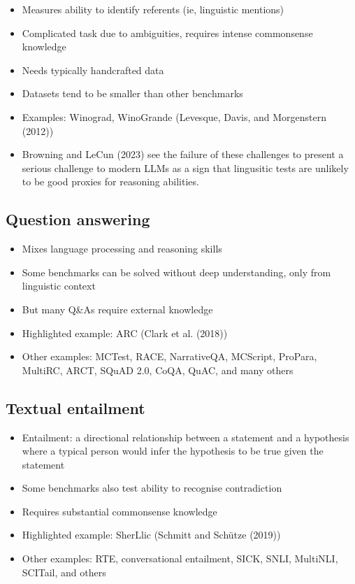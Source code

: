 \documentclass[
]{article}
\providecommand{\tightlist}{%
  \setlength{\itemsep}{0pt}\setlength{\parskip}{0pt}}\usepackage{longtable,booktabs,array}
\begin{document}
\begin{itemize}
\tightlist
\item
  Measures ability to identify referents (ie, linguistic mentions)
\item
  Complicated task due to ambiguities, requires intense commonsense
  knowledge
\item
  Needs typically handcrafted data
\item
  Datasets tend to be smaller than other benchmarks
\item
  Examples: Winograd, WinoGrande (Levesque, Davis, and Morgenstern
  (2012))
\item
  Browning and LeCun (2023) see the failure of these challenges to
  present a serious challenge to modern LLMs as a sign that lingusitic
  tests are unlikely to be good proxies for reasoning abilities.
\end{itemize}

\subsection{Question answering}\label{question-answering}

\begin{itemize}
\tightlist
\item
  Mixes language processing and reasoning skills
\item
  Some benchmarks can be solved without deep understanding, only from
  linguistic context
\item
  But many Q\&As require external knowledge
\item
  Highlighted example: ARC (Clark et al. (2018))
\item
  Other examples: MCTest, RACE, NarrativeQA, MCScript, ProPara, MultiRC,
  ARCT, SQuAD 2.0, CoQA, QuAC, and many others
\end{itemize}

\subsection{Textual entailment}\label{textual-entailment}

\begin{itemize}
\tightlist
\item
  Entailment: a directional relationship between a statement and a
  hypothesis where a typical person would infer the hypothesis to be
  true given the statement
\item
  Some benchmarks also test ability to recognise contradiction
\item
  Requires substantial commonsense knowledge
\item
  Highlighted example: SherLlic (Schmitt and Schütze (2019))
\item
  Other examples: RTE, conversational entailment, SICK, SNLI, MultiNLI,
  SCITail, and others
\end{itemize}
\end{document}
